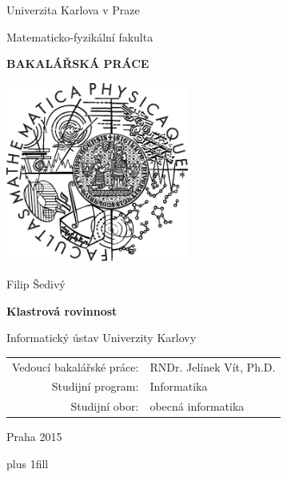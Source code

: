 \documentclass[12pt,a4report]{report}
\theoremstyle{definition}
\begin{document}
\author{Filip Šedivý}

\begin{center}

\large

Univerzita Karlova v Praze

\medskip

Matematicko-fyzikální fakulta

\vfill

{\bf\Large BAKALÁŘSKÁ PRÁCE}

\vfill

\centerline{\mbox{\includegraphics[width=60mm]{logo.eps}}}

\vfill
\vspace{5mm}

{\LARGE Filip Šedivý}

\vspace{15mm}

{\LARGE\bfseries Klastrová rovinnost}

\vfill

Informatický ústav Univerzity Karlovy

\vfill

\begin{tabular}{rl}

Vedoucí bakalářské práce: & RNDr. Jelínek Vít, Ph.D.\\
\noalign{\vspace{2mm}}
Studijní program: & Informatika \\
\noalign{\vspace{2mm}}
Studijní obor: & obecná informatika \\
\end{tabular}

\vfill

Praha 2015 

\end{center}

\newpage

\vglue 0pt plus 1fill
\end{document}

